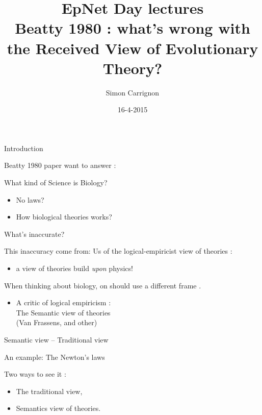 \documentclass{beamer}
\title{EpNet Day lectures\\ Beatty 1980 : what's wrong with the Received View of Evolutionary Theory?}
\author{Simon Carrignon}
\date{16-4-2015}
\begin{document}
\begin{frame}
	\maketitle
\end{frame}

\begin{frame}{Introduction}
	
	\vfill
Beatty 1980 paper want to answer :
	\vfil
	\begin{center}
		\begin{block}
			{What kind of Science is Biology?}
			\vfil
			\begin{itemize}
					\vfil
				\item No laws?
					\vfil
				\item How biological theories works?
			\end{itemize}
		\end{block}
	\end{center}

\end{frame}

\begin{frame}{What's inaccurate?}

	\begin{block}{This inaccuracy come from:}
	Us of the logical-empiricist view of theories : 
		\begin{itemize}
			\item 	a view of theories build \emph{upon} physics!\\
		\end{itemize}
	\end{block}
\end{frame}
\begin{frame}
	When thinking about biology, on should use a different frame .
	\vfil
	\begin{itemize}
		\item A critic of logical empiricism :\\ \vspace{.5cm}  \centering The Semantic view of theories \\ (Van Frassens, and other)
	\end{itemize}
\end{frame}


\begin{frame}{Semantic view -- Traditional view}

	An example: \alert{The Newton's laws}
	\vfill
	\begin{block}
		{Two ways to see it :}
				\begin{itemize}
				\vfill
			\item The traditional view,
				\vfill
			\item Semantics view of theories.
		\end{itemize}
	\end{block}
\end{frame}
\end{document}
